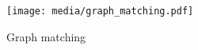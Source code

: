 \begin{landscape}
    \centering
    \begin{figure}[t]
        \vspace*{-1.3cm}
        \centering
        \texttt{[image: media/graph\_matching.pdf]}
        \caption{Graph matching}
        \label{fig:graph-matching}
    \end{figure}
\end{landscape}